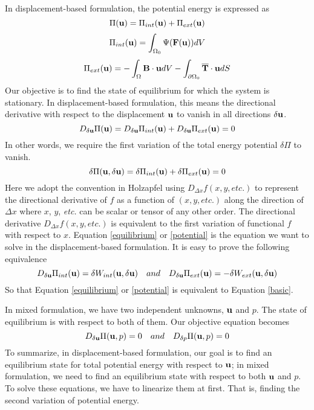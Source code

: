 In displacement-based formulation, the potential energy is expressed as
\begin{equation}
\Pi(\bold{u}) = \Pi_{int}(\bold{u}) + \Pi_{ext}(\bold{u})
\end{equation}
\begin{equation} \label{pint}
\Pi_{int}(\bold{u}) = \int_{\Omega_{0}}\Psi(\bold{F}(\bold{u}))dV
\end{equation}
\begin{equation} \label{pext}
\Pi_{ext}(\bold{u}) =  - \int_\Omega\bold{B}\cdot\bold{u}dV -  \int_{\partial{\Omega_0}}\overline{\bold{T}}\cdot{\bold{u}}dS
\end{equation}
Our objective is to find the state of equilibrium for which the system is stationary. In displacement-based formulation, this means the directional derivative with respect to the displacement $\bold{u}$ to vanish in all directions $\delta{\bold{u}}$.
\begin{equation} \label{equilibrium}
D_{\delta\bold{u}}\Pi(\bold{u}) = D_{\delta\bold{u}}\Pi_{int}(\bold{u}) + D_{\delta\bold{u}}\Pi_{ext}(\bold{u}) = 0
\end{equation} 
 In other words, we require the first variation of the total energy potential $\delta\Pi$ to vanish.
 \begin{equation} \label{potential}
\delta\Pi(\bold{u}, \delta\bold{u}) =\delta\Pi_{int}(\bold{u}) + \delta\Pi_{ext}(\bold{u}) = 0
\end{equation}
Here we adopt the convention in Holzapfel using $D_{\Delta{x}}f(x, y, \textit{etc.})$ to represent the directional derivative of $f$ as a function of $(x, y, \textit{etc.})$ along the direction of $\Delta{x}$ where $x$, $y$, \textit{etc.} can be scalar or tensor of any other order. The directional derivative $D_{\Delta{x}}f(x, y, \textit{etc.})$ is equivalent to the first variation of functional $f$ with respect to $x$.
Equation \ref{equilibrium} or \ref{potential} is the equation we want to solve in the displacement-based formulation. It is easy to prove the following equivalence
\begin{equation}
D_{\delta\bold{u}}\Pi_{int}(\bold{u}) = \delta W_{int}(\bold{u}, \delta\bold{u}) \quad and \quad
D_{\delta\bold{u}}\Pi_{ext}(\bold{u}) = - \delta W_{ext}(\bold{u}, \delta\bold{u})
\end{equation}
So that Equation \ref{equilibrium} or \ref{potential} is equivalent to Equation \ref{basic}. 

In mixed formulation, we have two independent unknowns, $\bold{u}$ and $p$. The state of equilibrium is with respect to both of them. Our objective equation becomes
\begin{equation} \label{target}
D_{\delta\bold{u}}\Pi(\bold{u}, p) = 0 \quad and \quad D_{\delta{p}}\Pi(\bold{u}, p) = 0
\end{equation}
To summarize, in displacement-based formulation, our goal is to find an equilibrium state for total potential energy with respect to $\bold{u}$; in mixed formulation, we need to find an equilibrium state with respect to both $\bold{u}$ and $p$. To solve these equations, we have to linearize them at first. That is, finding the second variation of potential energy.


